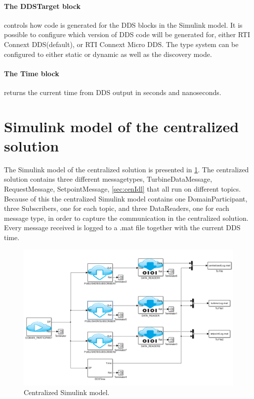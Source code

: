 \paragraph{The DDSTarget block} controls how code is generated for the DDS blocks in the Simulink model. It is possible to configure which version of DDS code will be generated for, either RTI Connext DDS(default), or RTI Connext Micro DDS. The type system can be configured to either static or dynamic as well as the discovery mode.

\paragraph{The Time block} returns the current time from DDS output in seconds and nanoseconds.

\section{Simulink model of the centralized solution}\label{subsec:centralizedmodel}
The Simulink model of the centralized solution is presented in \cref{fig:centralizedSimulinkModel}. The centralized solution contains three different messagetypes, TurbineDataMessage, RequestMessage, SetpointMessage, \cref{sec:cenIdl} that all run on different topics. Because of this the centralized Simulink model contains one DomainParticipant, three Subscribers, one for each topic, and three DataReaders, one for each message type, in order to capture the communication in the centralized solution. Every message received is logged to a .mat file together with the current DDS time.

\begin{figure}[!h]
	\includegraphics[width=\textwidth]{figures/CentralizedModel}
	\caption[Centralized Simulink model]{
		\label{fig:centralizedSimulinkModel} 
		\footnotesize{%
			Centralized Simulink model.
		}
	}
\end{figure}

